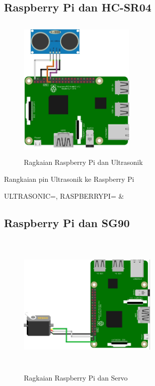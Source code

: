 \subsection{Raspberry Pi dan HC-SR04}
\begin{figure} [H]
    \includegraphics[height=7cm, width=0.5\textwidth, center]{images/skematik_ultra.jpg}
    \caption{Ragkaian Raspberry Pi dan Ultrasonik}
    \label{fig:skematikUltrasonik}
\end{figure}

\begin{atable}
    \caption{Rangkaian pin Ultrasonik ke Raspberry Pi}
    \label{table:tableUltrasonic}
        {
            ULTRASONIC=\ULTRASONIC, 
            RASPBERRYPI=\RASPBERRYPI}
        {
            \ULTRASONIC & 
            \RASPBERRYPI}
\end{atable}

\subsection{Raspberry Pi dan SG90}
\begin{figure} [H]
    \includegraphics[height=7cm, width=0.6\textwidth, center]{images/skematik_servo.jpg}
    \caption{Ragkaian Raspberry Pi dan Servo}
    \label{fig:skematikServo}
\end{figure}


